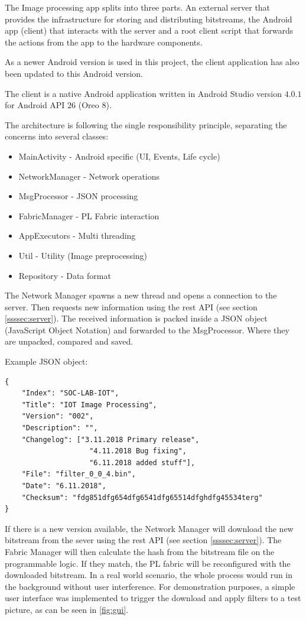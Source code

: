 The Image processing app splits into three parts. An external server that provides the infrastructure for storing and distributing bitstreams, the Android app (client) that interacts with the server and a root client script that forwards the actions from the app to the hardware components. 

\label{ssssec:clientapp}
As a newer Android version is used in this project, the client application has also been updated to this Android version.

The client is a native Android application written in Android Studio version $4.0.1$ for Android API $26$ (Oreo $8$).

The architecture is following the single responsibility principle, separating the concerns into several classes:

\begin{itemize}
    \item MainActivity 	    - Android specific (UI, Events, Life cycle)
    \item NetworkManager	- Network operations 
    \item MsgProcessor	    - JSON processing 
    \item FabricManager	    - PL Fabric interaction
    \item AppExecutors	    - Multi threading
    \item Util			    - Utility (Image preprocessing)
    \item Repository        - Data format
\end{itemize}

The Network Manager spawns a new thread and opens a connection to the server. Then requests new information using the \gls{rest} API (see section \ref{ssssec:server}). The received information is packed inside a JSON object (JavaScript Object Notation) and forwarded to the MsgProcessor. Where they are unpacked, compared and saved.

Example JSON object:
\begin{verbatim}
{
    "Index": "SOC-LAB-IOT",
    "Title": "IOT Image Processing",
    "Version": "002",
    "Description": "",
    "Changelog": ["3.11.2018 Primary release", 
                    "4.11.2018 Bug fixing", 
                    "6.11.2018 added stuff"],
    "File": "filter_0_0_4.bin",
    "Date": "6.11.2018",
    "Checksum": "fdg851dfg654dfg6541dfg65514dfghdfg45534terg"
}  
\end{verbatim}

If there is a new version available, the Network Manager will download the new bitstream from the sever using the \gls{rest} API (see section \ref{ssssec:server}). The Fabric Manager will then calculate the hash from the bitstream file on the programmable logic. If they match, the PL fabric will be reconfigured with the downloaded bitstream. In a real world scenario, the whole process would run in the background without user interference. For demonstration purposes, a simple user interface was implemented to trigger the download and apply filters to a test picture, as can be seen in \cref{fig:gui}.

